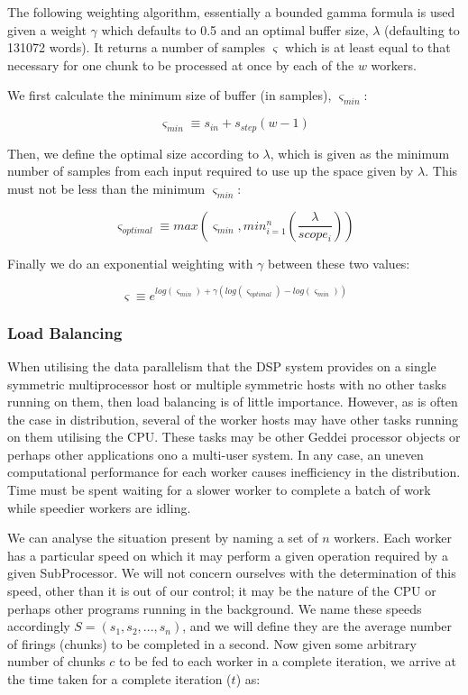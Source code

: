 The following weighting algorithm, essentially a bounded gamma formula is used given a weight $\gamma$ which defaults to 0.5 and an optimal buffer size, $\lambda$ (defaulting to 131072 words). It returns a number of samples $\varsigma$ which is at least equal to that necessary for one chunk to be processed at once by each of the $w$ workers.

We first calculate the minimum size of buffer (in samples), $\varsigma_{min}$:

$$
	\varsigma_{min} \equiv s_{in} + s_{step}(w - 1)
$$

Then, we define the optimal size according to $\lambda$, which is given as the minimum number of samples from each input required to use up the space given by $\lambda$. This must not be less than the minimum $\varsigma_{min}$:

$$
	\varsigma_{optimal} \equiv max(\varsigma_{min}, min_{i=1}^n(\frac{\lambda}{scope_i}))
$$

Finally we do an exponential weighting with $\gamma$ between these two values:

$$
	\varsigma \equiv e^{log(\varsigma_{min}) + \gamma(log(\varsigma_{optimal}) - log(\varsigma_{min}))}
$$

\subsubsection{Load Balancing}\label{sec:loadbalancing}

When utilising the data parallelism that the DSP system provides on a single symmetric multiprocessor host or multiple symmetric hosts with no other tasks running on them, then load balancing is of little importance. However, as is often the case in distribution, several of the worker hosts may have other tasks running on them utilising the CPU. These tasks may be other Geddei processor objects or perhaps other applications ono a multi-user system. In any case, an uneven computational performance for each worker causes inefficiency in the distribution. Time must be spent waiting for a slower worker to complete a batch of work while speedier workers are idling.

We can analyse the situation present by naming a set of $n$ workers. Each worker has a particular speed on which it may perform a given operation required by a given SubProcessor. We will not concern ourselves with the determination of this speed, other than it is out of our control; it may be the nature of the CPU or perhaps other programs running in the background. We name these speeds accordingly $S = (s_1, s_2,...,s_n)$, and we will define they are the average number of firings (chunks) to be completed in a second. Now given some arbitrary number of chunks $c$ to be fed to each worker in a complete iteration, we arrive at the time taken for a complete iteration ($t$) as:

